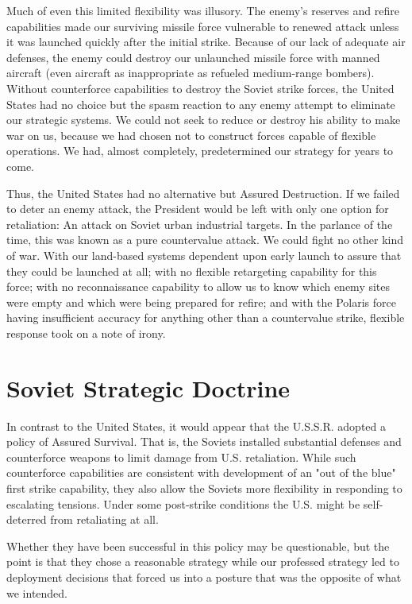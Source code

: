 Much of even this limited flexibility was illusory. The enemy's reserves and refire capabilities made our surviving missile force vulnerable to renewed attack unless it was launched quickly after the initial strike. Because of our lack of adequate air defenses, the enemy could destroy our unlaunched missile force with manned aircraft (even aircraft as inappropriate as refueled medium-range bombers). Without counterforce capabilities to destroy the Soviet strike forces, the United States had no choice but the spasm reaction to any enemy attempt to eliminate our strategic systems. We could not seek to reduce or destroy his ability to make war on us, because we had chosen not to construct forces capable of flexible operations. We had, almost completely, predetermined our strategy for years to come.

Thus, the United States had no alternative but Assured Destruction. If we failed to deter an enemy attack, the President would be left with only one option for retaliation: An attack on Soviet urban industrial targets. In the parlance of the time, this was known as a pure countervalue attack. We could fight no other kind of war. With our land-based systems dependent upon early launch to assure that they could be launched at all; with no flexible retargeting capability for this force; with no reconnaissance capability to allow us to know which enemy sites were empty and which were being prepared for refire; and with the Polaris force having insufficient accuracy for anything other than a countervalue strike, flexible response took on a note of irony.

\section{Soviet Strategic Doctrine}
In contrast to the United States, it would appear that the U.S.S.R. adopted a policy of Assured Survival. That is, the Soviets installed substantial defenses and counterforce weapons to limit damage from U.S. retaliation. While such counterforce capabilities are consistent with development of an "out of the blue" first strike capability, they also allow the Soviets more flexibility in responding to escalating tensions. Under some post-strike conditions the U.S. might be self-deterred from retaliating at all.

Whether they have been successful in this policy may be questionable, but the point is that they chose a reasonable strategy while our professed strategy led to deployment decisions that forced us into a posture that was the opposite of what we intended.

